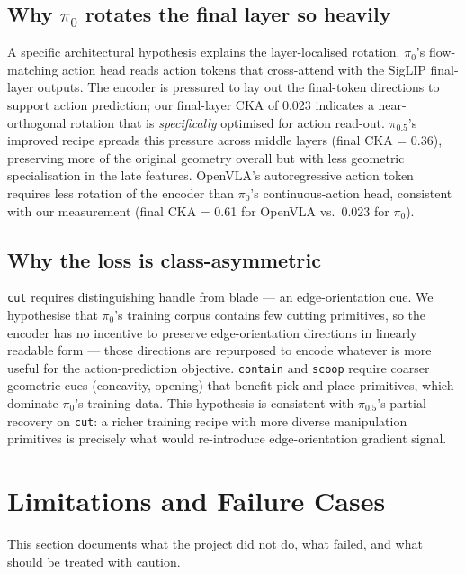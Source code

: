 \documentclass[11pt]{article}
\begin{document}
\subsection{Why $\pi_0$ rotates the final layer so heavily}

A specific architectural hypothesis explains the layer-localised
rotation. $\pi_0$'s flow-matching action head reads action tokens that
cross-attend with the SigLIP final-layer outputs. The encoder is
pressured to lay out the final-token directions to support action
prediction; our final-layer CKA of 0.023 indicates a near-orthogonal
rotation that is \emph{specifically} optimised for action read-out.
$\pi_{0.5}$'s improved recipe spreads this pressure across middle
layers (final CKA = 0.36), preserving more of the original geometry
overall but with less geometric specialisation in the late features.
OpenVLA's autoregressive action token requires less rotation of the
encoder than $\pi_0$'s continuous-action head, consistent with our
measurement (final CKA = 0.61 for OpenVLA vs.\ 0.023 for $\pi_0$).

\subsection{Why the loss is class-asymmetric}

\texttt{cut} requires distinguishing handle from blade --- an
edge-orientation cue. We hypothesise that $\pi_0$'s training corpus
contains few cutting primitives, so the encoder has no incentive to
preserve edge-orientation directions in linearly readable form ---
those directions are repurposed to encode whatever is more useful for
the action-prediction objective. \texttt{contain} and \texttt{scoop}
require coarser geometric cues (concavity, opening) that benefit
pick-and-place primitives, which dominate $\pi_0$'s training data.
This hypothesis is consistent with $\pi_{0.5}$'s partial recovery on
\texttt{cut}: a richer training recipe with more diverse manipulation
primitives is precisely what would re-introduce edge-orientation
gradient signal.

\section{Limitations and Failure Cases}
\label{sec:limits}

This section documents what the project did not do, what failed, and
what should be treated with caution.
\end{document}
